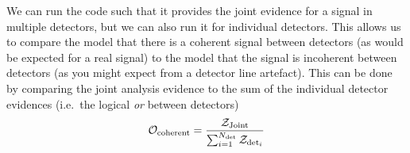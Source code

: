 We can run the code such that it provides the joint evidence for a signal in multiple detectors, but we can
also run it for individual detectors. This allows us to compare the model that there is a coherent signal
between detectors (as would be expected for a real signal) to the model that the signal is incoherent between
detectors (as you might expect from a detector line artefact). This can be done by comparing the joint
analysis evidence to the sum of the individual detector evidences (i.e.\ the logical {\it or} between
detectors)
\begin{equation}
\mathcal{O}_{\rm coherent} = \frac{\mathcal{Z}_{\rm Joint}}{\sum_{i=1}^{N_{\rm det}} \mathcal{Z}_{{\rm det}_i}}
\end{equation}

  